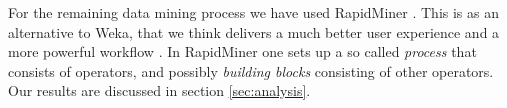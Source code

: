 For the remaining data mining process we have used RapidMiner \cite{rapidminer}. This is as an alternative to Weka, that we think delivers a much better user experience and a more powerful workflow \cite{weka}. In RapidMiner one sets up a so called \textit{process} that consists of operators, and possibly \textit{building blocks} consisting of other operators. Our results are discussed in section \ref{sec:analysis}.





